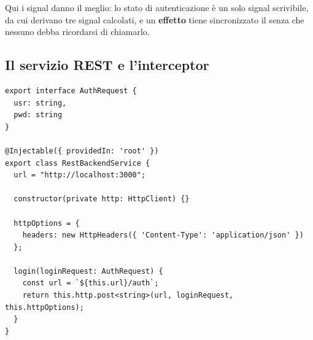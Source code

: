 \begin{affianco}[0.42][c]
Qui i signal danno il meglio: lo stato di autenticazione è un solo signal
scrivibile, da cui derivano tre signal calcolati, e un \textbf{effetto} tiene
sincronizzato il  senza che nessuno debba ricordarsi di
chiamarlo.
\risultato
\begin{immagine}
\end{immagine}
\end{affianco}

\subsection{Il servizio REST e l'interceptor}

\begin{lstlisting}[style=ts, name=rest-backend.service.ts]
export interface AuthRequest {
  usr: string,
  pwd: string
}

@Injectable({ providedIn: 'root' })
export class RestBackendService {
  url = "http://localhost:3000";

  constructor(private http: HttpClient) {}

  httpOptions = {
    headers: new HttpHeaders({ 'Content-Type': 'application/json' })
  };

  login(loginRequest: AuthRequest) {
    const url = `${this.url}/auth`;
    return this.http.post<string>(url, loginRequest, this.httpOptions);
  }
}
\end{lstlisting}

